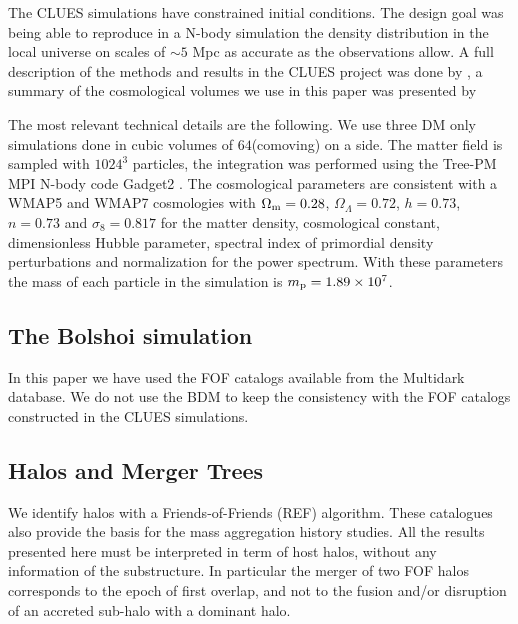 \documentclass[usenatbib]{latex/mn2e}
\begin{document}
The CLUES simulations have constrained initial conditions. The design goal 
was being able to reproduce in a N-body simulation the density distribution 
in the local universe on scales of $\sim5$ Mpc as accurate as the 
observations allow. A full description of the methods and results in the 
CLUES project was done by , a summary  of the 
cosmological volumes we use in this paper was presented by 


The most relevant technical details are the following. We use three DM only
simulations done in cubic volumes of $64$\hMpc (comoving) on a side. The 
matter field is sampled with $1024^3$ particles, the integration was 
performed using the Tree-PM MPI N-body code Gadget2 . 
The cosmological parameters are consistent with a WMAP5 and WMAP7 cosmologies 
with $\Omega_{\rm m}=0.28$, $\Omega_{\Lambda}=0.72$, $h=0.73$, $n=0.73$ and 
$\sigma_{8}=0.817$  for the matter density, 
cosmological constant, dimensionless Hubble parameter, spectral index of 
primordial density perturbations and normalization for the power spectrum. 
With these parameters the mass of each particle in the simulation is 
$m_{\rm p}=1.89\times 10^{7}$\hMsun.


\subsection{The Bolshoi simulation}
\label{subsec:Bolshoi_simulation}


In this paper we have used the FOF catalogs available from the Multidark 
database. We do not use the BDM to keep the consistency with the FOF 
catalogs constructed in the CLUES simulations. 


\subsection{Halos and Merger Trees}
\label{subsec:halos_merger_trees}


We identify halos with a Friends-of-Friends (REF) algorithm. These 
catalogues also provide the basis for the mass aggregation history studies. 
All the results presented here must be interpreted in term of host halos, 
without any information of the substructure. In particular the merger of 
two FOF halos corresponds to the epoch of first overlap, and not to the 
fusion and/or disruption of an accreted sub-halo with a dominant halo. 
\end{document}
